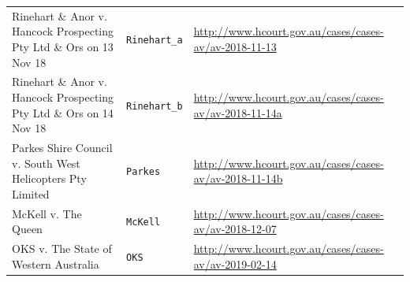 \documentclass{monashthesis}
\begin{document}
\begin{longtable}[]{@{}lll@{}}
\begin{minipage}[t]{0.42\columnwidth}\raggedright
Rinehart \& Anor v. Hancock Prospecting Pty Ltd \& Ors on 13 Nov 18\strut
\end{minipage} & \begin{minipage}[t]{0.14\columnwidth}\raggedright
\texttt{Rinehart\_a}\strut
\end{minipage} & \begin{minipage}[t]{0.35\columnwidth}\raggedright
\url{http://www.hcourt.gov.au/cases/cases-av/av-2018-11-13}\strut
\end{minipage}\tabularnewline
\begin{minipage}[t]{0.42\columnwidth}\raggedright
Rinehart \& Anor v. Hancock Prospecting Pty Ltd \& Ors on 14 Nov 18\strut
\end{minipage} & \begin{minipage}[t]{0.14\columnwidth}\raggedright
\texttt{Rinehart\_b}\strut
\end{minipage} & \begin{minipage}[t]{0.35\columnwidth}\raggedright
\url{http://www.hcourt.gov.au/cases/cases-av/av-2018-11-14a}\strut
\end{minipage}\tabularnewline
\begin{minipage}[t]{0.42\columnwidth}\raggedright
Parkes Shire Council v. South West Helicopters Pty Limited\strut
\end{minipage} & \begin{minipage}[t]{0.14\columnwidth}\raggedright
\texttt{Parkes}\strut
\end{minipage} & \begin{minipage}[t]{0.35\columnwidth}\raggedright
\url{http://www.hcourt.gov.au/cases/cases-av/av-2018-11-14b}\strut
\end{minipage}\tabularnewline
\begin{minipage}[t]{0.42\columnwidth}\raggedright
McKell v. The Queen\strut
\end{minipage} & \begin{minipage}[t]{0.14\columnwidth}\raggedright
\texttt{McKell}\strut
\end{minipage} & \begin{minipage}[t]{0.35\columnwidth}\raggedright
\url{http://www.hcourt.gov.au/cases/cases-av/av-2018-12-07}\strut
\end{minipage}\tabularnewline
\begin{minipage}[t]{0.42\columnwidth}\raggedright
OKS v. The State of Western Australia\strut
\end{minipage} & \begin{minipage}[t]{0.14\columnwidth}\raggedright
\texttt{OKS}\strut
\end{minipage} & \begin{minipage}[t]{0.35\columnwidth}\raggedright
\url{http://www.hcourt.gov.au/cases/cases-av/av-2019-02-14}\strut
\end{minipage}\tabularnewline
\bottomrule
\end{longtable}
\end{document}
